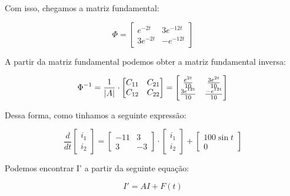 \documentclass[12pt]{article}%
\DeclarePairedDelimiter\abs{\lvert}{\rvert}%
\begin{document}
    Com isso, chegamos a matriz fundamental:
    
    \begin{equation}
        \Phi = 
        \begin{bmatrix}
            e^{-2t} & 3e^{-12t} \\
            3e^{-2t} & -e^{-12t} 
        \end{bmatrix}
    \end{equation}
    
    A partir da matriz fundamental podemos obter a matriz fundamental inversa:
    
    \begin{equation}
        \Phi^{-1} = \frac{1}{\abs{A}}
        \cdot 
        \begin{bmatrix}
            C_{11} & C_{21} \\
            C_{12} & C_{22}
        \end{bmatrix}
        =
        \begin{bmatrix}
            \frac{e^{2t}}{10} & \frac{3e^{2t}}{10} \\
            \frac{3e^{12t}}{10} & \frac{-e^{12t}}{10}
        \end{bmatrix}
    \end{equation}
    
    Dessa forma, como tinhamos a seguinte expressão:
    
    \[
    \frac{d}{dt}
    \begin{bmatrix}
        i_{1}     \\
        i_{2}      
    \end{bmatrix}
    = 
    \begin{bmatrix}
       -11  &  3      \\
       3  &  -3     
    \end{bmatrix} 
    \cdot
    \begin{bmatrix}
        i_{1}     \\
        i_{2}      
    \end{bmatrix}
    +
    \begin{bmatrix}
        100\sin{t}     \\
        0      
    \end{bmatrix}
    \]
    
    Podemos encontrar I' a partir da seguinte equação:
    
    \begin{equation}
        I' = AI + F(t)
    \end{equation}
    
\end{document}
